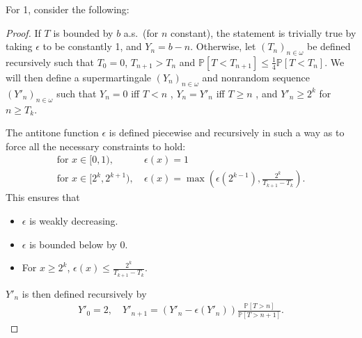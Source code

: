 For 1, consider the following:
\begin{proof}
If $T$ is bounded by $b$ a.s.~(for $n$ constant), the statement is trivially true by taking $\epsilon$ to be constantly 1, and $Y_n = b - n$.
Otherwise, let $(T_n)_{n \in \omega}$ be defined recursively such that $T_0 = 0$, $T_{n+1} > T_n$ and $\mathbb P[T < T_{n+1}] \leq \frac 1 4 \mathbb P[T < T_n]$. 
We will then define a supermartingale $(Y_n)_{n \in \omega}$ and nonrandom sequence $(Y'_n)_{n \in \omega}$ such that $Y_n = 0$ iff $T < n$ , $Y_n = Y'_n$ iff $T \geq n$ , and $Y'_n \geq 2^k$ for $n \geq T_k$.


The antitone function  $\epsilon$ is defined piecewise and recursively in such a way as to force all the necessary constraints to hold:
\begin{align*}
    \text{for }x \in [0,1),\ &\epsilon(x) = 1 \\
    \text{for }x \in [2^k,2^{k+1}),\ &\epsilon(x) = \max \left (\epsilon(2^{k-1}), \frac{2^k}{T_{k+1}-T_k} \right ).
\end{align*}
This ensures that
\begin{itemize}
\item $\epsilon$ is weakly decreasing. 
\item $\epsilon$ is bounded below by 0.
\item For $x \geq 2^k$, $\epsilon(x) \leq \frac{2^k}{T_{k+1}-T_k}$. 
\end{itemize}

$Y'_n$ is then defined recursively by
\begin{align*}
    Y'_0 = 2, \quad
    Y'_{n+1} = (Y'_n - \epsilon(Y'_n)) \frac{\mathbb P[T > n]}{\mathbb P[T > n+1]}.
\end{align*}


\end{proof}
